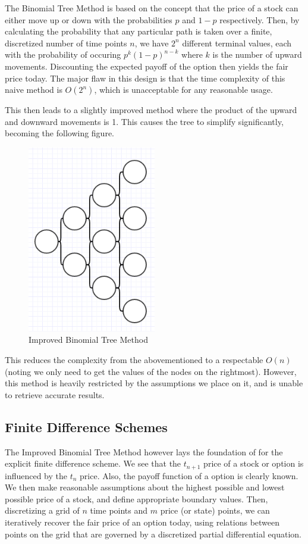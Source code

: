 \documentclass{article}
\begin{document}
The Binomial Tree Method is based on the concept that the price of a stock can either move up or down with the probabilities \(p\) and \(1-p\) respectively. Then, by calculating the probability that any particular path is taken over a finite, discretized number of time points \(n\), we have \(2^n\) different terminal values, each with the probability of occuring \(p^k(1-p)^{n-k}\) where \(k\) is the number of upward movements. Discounting the expected payoff of the option then yields the fair price today. The major flaw in this design is that the time complexity of this naive method is \(O(2^n)\), which is unacceptable for any reasonable usage.

This then leads to a slightly improved method where the product of the upward and downward movements is 1. This causes the tree to simplify significantly, becoming the following figure.

\begin{figure}[H]
  \includegraphics[width=0.5\textwidth]{btm_improved}
  \caption{Improved Binomial Tree Method}
  \label{figure:name}
\end{figure}

This reduces the complexity from the abovementioned to a respectable \(O(n)\) (noting we only need to get the values of the nodes on the rightmost). However, this method is heavily restricted by the assumptions we place on it, and is unable to retrieve accurate results.

\subsection{Finite Difference Schemes}
The Improved Binomial Tree Method however lays the foundation of for the explicit finite difference scheme. We see that the \(t_{n+1}\) price of a stock or option is influenced by the \(t_n\) price. Also, the payoff function of a option is clearly known. We then make reasonable assumptions about the highest possible and lowest possible price of a stock, and define appropriate boundary values. Then, discretizing a grid of \(n\) time points and \(m\) price (or state) points, we can iteratively recover the fair price of an option today, using relations between points on the grid that are governed by a discretized partial differential equation.
\end{document}
